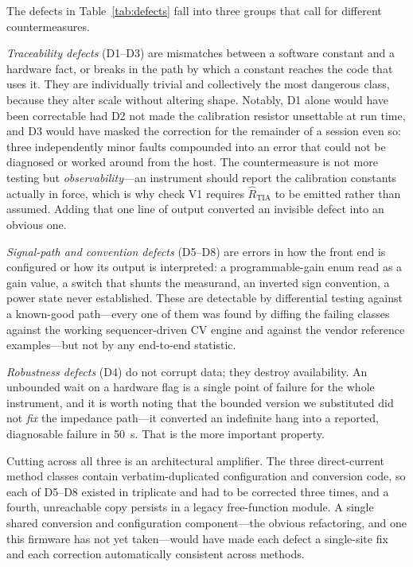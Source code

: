 The defects in Table~\ref{tab:defects} fall into three groups that call for
different countermeasures.

\emph{Traceability defects} (D1--D3) are mismatches between a software constant
and a hardware fact, or breaks in the path by which a constant reaches the code
that uses it. They are individually trivial and collectively the most dangerous
class, because they alter scale without altering shape. Notably, D1 alone would
have been correctable had D2 not made the calibration resistor unsettable at
run time, and D3 would have masked the correction for the remainder of a
session even so: three independently minor faults compounded into an error that
could not be diagnosed or worked around from the host. The countermeasure is
not more testing but \emph{observability}---an instrument should report the
calibration constants actually in force, which is why check V1 requires
$\hat{R}_{\mathrm{TIA}}$ to be emitted rather than assumed. Adding that one line
of output converted an invisible defect into an obvious one.

\emph{Signal-path and convention defects} (D5--D8) are errors in how the front
end is configured or how its output is interpreted: a programmable-gain enum
read as a gain value, a switch that shunts the measurand, an inverted sign
convention, a power state never established. These are detectable by
differential testing against a known-good path---every one of them was found by
diffing the failing classes against the working sequencer-driven CV engine and
against the vendor reference examples---but not by any end-to-end statistic.

\emph{Robustness defects} (D4) do not corrupt data; they destroy availability.
An unbounded wait on a hardware flag is a single point of failure for the whole
instrument, and it is worth noting that the bounded version we substituted did
not \emph{fix} the impedance path---it converted an indefinite hang into a
reported, diagnosable failure in \SI{50}{\second}. That is the more important
property.

Cutting across all three is an architectural amplifier. The three direct-current
method classes contain verbatim-duplicated configuration and conversion code, so
each of D5--D8 existed in triplicate and had to be corrected three times, and a
fourth, unreachable copy persists in a legacy free-function module. A single
shared conversion and configuration component---the obvious refactoring, and one
this firmware has not yet taken---would have made each defect a single-site fix
and each correction automatically consistent across methods.

